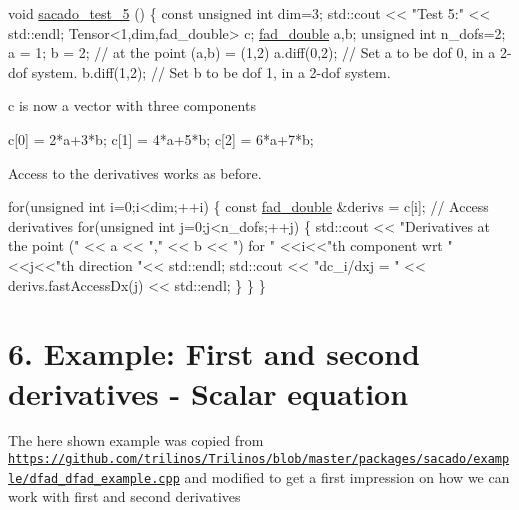 \begin{DoxyCode}
\textcolor{keywordtype}{void} \hyperlink{Sacado__example_8cc_a327dbbb4ea7fc9840c46d149843a44c2}{sacado\_test\_5} ()
\{
    \textcolor{keyword}{const} \textcolor{keywordtype}{unsigned} \textcolor{keywordtype}{int} dim=3;
    std::cout << \textcolor{stringliteral}{"Test 5:"} << std::endl;
    Tensor<1,dim,fad\_double> c;
    \hyperlink{Sacado-auxiliary__functions_8h_a868b94676739e612d9c95940e70892a9}{fad\_double} a,b;
    \textcolor{keywordtype}{unsigned} \textcolor{keywordtype}{int} n\_dofs=2;
    a = 1; b = 2;   \textcolor{comment}{// at the point (a,b) = (1,2)}
    a.diff(0,2);  \textcolor{comment}{// Set a to be dof 0, in a 2-dof system.}
    b.diff(1,2);  \textcolor{comment}{// Set b to be dof 1, in a 2-dof system.}
\end{DoxyCode}
 c is now a vector with three components 
\begin{DoxyCode}
c[0] = 2*a+3*b;
c[1] = 4*a+5*b;
c[2] = 6*a+7*b;
\end{DoxyCode}
 Access to the derivatives works as before. 
\begin{DoxyCode}
    \textcolor{keywordflow}{for}(\textcolor{keywordtype}{unsigned} \textcolor{keywordtype}{int} i=0;i<dim;++i)
    \{
        \textcolor{keyword}{const} \hyperlink{Sacado-auxiliary__functions_8h_a868b94676739e612d9c95940e70892a9}{fad\_double} &derivs = c[i]; \textcolor{comment}{// Access derivatives}
        \textcolor{keywordflow}{for}(\textcolor{keywordtype}{unsigned} \textcolor{keywordtype}{int} j=0;j<n\_dofs;++j)
        \{
            std::cout << \textcolor{stringliteral}{"Derivatives at the point ("} << a << \textcolor{stringliteral}{","} << b << \textcolor{stringliteral}{") for "}
            <<i<<\textcolor{stringliteral}{"th component wrt "}<<j<<\textcolor{stringliteral}{"th direction "}<< std::endl;
            std::cout << \textcolor{stringliteral}{"dc\_i/dxj = "} << derivs.fastAccessDx(j) << std::endl;            
        \}
    \}
\}
\end{DoxyCode}
 \hypertarget{index_Ex6}{}\section{6. Example\+: First and second derivatives -\/ Scalar equation}\label{index_Ex6}
The here shown example was copied from \href{https://github.com/trilinos/Trilinos/blob/master/packages/sacado/example/dfad_dfad_example.cpp}{\tt https\+://github.\+com/trilinos/\+Trilinos/blob/master/packages/sacado/example/dfad\+\_\+dfad\+\_\+example.\+cpp} and modified to get a first impression on how we can work with first and second derivatives 
